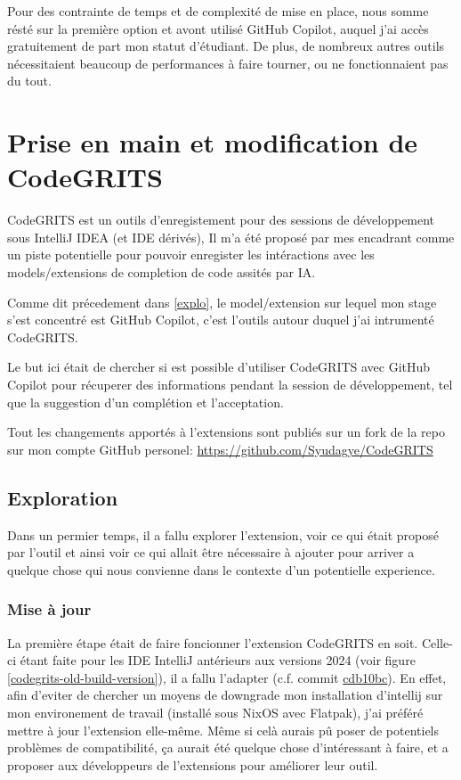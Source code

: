 Pour des contrainte de temps et de complexité de mise en place, nous somme résté sur la première option et avont utilisé GitHub Copilot, auquel j'ai accès gratuitement de part mon statut d'étudiant.
De plus, de nombreux autres outils nécessitaient beaucoup de performances à faire tourner, ou ne fonctionnaient pas du tout.


\newpage
\section{Prise en main et modification de CodeGRITS}

CodeGRITS est un outils d'enregistement pour des sessions de développement sous IntelliJ IDEA (et IDE dérivés), Il m'a été proposé par mes encadrant comme un
piste potentielle pour pouvoir enregister les intéractions avec les models/extensions de completion de code assités par IA.

Comme dit précedement dans \ref{explo}, le model/extension sur lequel mon stage s'est concentré est GitHub Copilot, c'est l'outils autour duquel j'ai intrumenté CodeGRITS.

Le but ici était de chercher si est possible d'utiliser CodeGRITS avec GitHub Copilot pour récuperer des informations pendant la session de développement, tel que la suggestion d'un complétion et l'acceptation.

Tout les changements apportés à l'extensions sont publiés sur un fork de la repo sur mon compte GitHub personel: \url{https://github.com/Syudagye/CodeGRITS}


\subsection{Exploration}

Dans un permier temps, il a fallu explorer l'extension, voir ce qui était proposé par l'outil et ainsi voir ce qui allait être nécessaire à ajouter
pour arriver a quelque chose qui nous convienne dans le contexte d'un potentielle experience.


\subsubsection{Mise à jour}

La première étape était de faire foncionner l'extension CodeGRITS en soit.
Celle-ci étant faite pour les IDE IntelliJ antérieurs aux versions 2024 (voir figure \ref{codegrits-old-build-version}), il a fallu l'adapter
(c.f. commit \href{https://github.com/codegrits/CodeGRITS/commit/cdb10bcba529d050bfcb6c3693256f0e18450dad}{cdb10bc}).
En effet, afin d'eviter de chercher un moyens de downgrade mon installation d'intellij sur mon environement de travail (installé sous NixOS avec Flatpak),
j'ai préféré mettre à jour l'extension elle-même.
Même si celà aurais pû poser de potentiels problèmes de compatibilité, ça aurait été quelque chose d'intéressant à faire, et a proposer aux développeurs
de l'extensions pour améliorer leur outil.


